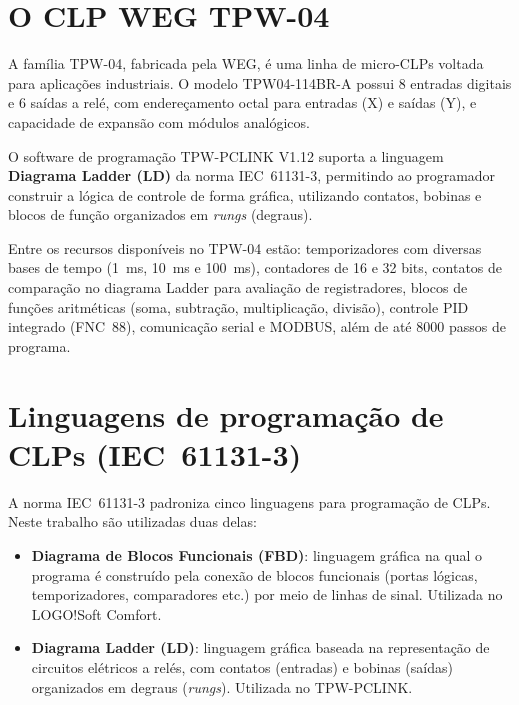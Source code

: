 \documentclass[
  12pt,
  openright,
  oneside,
  a4paper,
  chapter=TITLE,
  section=TITLE,
  brazilian
]{abntex2}
\begin{document}
\section{O CLP WEG TPW-04}

A fam\'{i}lia TPW-04, fabricada pela WEG, \'{e} uma linha de micro-CLPs voltada para aplica\c{c}\~{o}es industriais. O modelo TPW04-114BR-A possui 8 entradas digitais e 6 sa\'{i}das a rel\'{e}, com endere\c{c}amento octal para entradas (X) e sa\'{i}das (Y), e capacidade de expans\~{a}o com m\'{o}dulos anal\'{o}gicos.

O software de programa\c{c}\~{a}o TPW-PCLINK V1.12 suporta a linguagem \textbf{Diagrama Ladder (LD)} da norma IEC~61131-3, permitindo ao programador construir a l\'{o}gica de controle de forma gr\'{a}fica, utilizando contatos, bobinas e blocos de fun\c{c}\~{a}o organizados em \textit{rungs} (degraus).

Entre os recursos dispon\'{i}veis no TPW-04 est\~{a}o: temporizadores com diversas bases de tempo (1~ms, 10~ms e 100~ms), contadores de 16 e 32 bits, contatos de compara\c{c}\~{a}o no diagrama Ladder para avalia\c{c}\~{a}o de registradores, blocos de fun\c{c}\~{o}es aritm\'{e}ticas (soma, subtra\c{c}\~{a}o, multiplica\c{c}\~{a}o, divis\~{a}o), controle PID integrado (FNC~88), comunica\c{c}\~{a}o serial e MODBUS, al\'{e}m de at\'{e} 8000 passos de programa.

\section{Linguagens de programa\c{c}\~{a}o de CLPs (IEC~61131-3)}

A norma IEC~61131-3 padroniza cinco linguagens para programa\c{c}\~{a}o de CLPs. Neste trabalho s\~{a}o utilizadas duas delas:

\begin{itemize}
    \item \textbf{Diagrama de Blocos Funcionais (FBD)}: linguagem gr\'{a}fica na qual o programa \'{e} constru\'{i}do pela conex\~{a}o de blocos funcionais (portas l\'{o}gicas, temporizadores, comparadores etc.) por meio de linhas de sinal. Utilizada no LOGO!Soft Comfort.
    \item \textbf{Diagrama Ladder (LD)}: linguagem gr\'{a}fica baseada na representa\c{c}\~{a}o de circuitos el\'{e}tricos a rel\'{e}s, com contatos (entradas) e bobinas (sa\'{i}das) organizados em degraus (\textit{rungs}). Utilizada no TPW-PCLINK.
\end{itemize}
\end{document}
